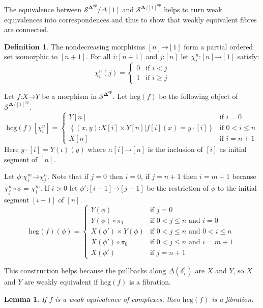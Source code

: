 \documentclass{amsart}
\theoremstyle{plain}
\newtheorem{lemma}[theorem]{Lemma}
\theoremstyle{definition}
\newtheorem{defin}[theorem]{Definition}
\newcommand\cat\mathcal
\newcommand\set[1]{\left\{#1\right\}}
\newcommand\dual{^{\mathrm{op}}}
\newcommand\simCat{\mathbf\Delta}
\newcommand\s{^{\simCat\dual}}
\newcommand\of{\mathord:}
\renewcommand\to{\mathord\rightarrow}
\newcommand\simplex\Delta
\begin{document}
The equivalence between $\cat S\s/\simplex[1]$ and $\cat S^{\simCat/[1]\dual}$ helps to turn weak equivalences into correspondences and thus to show that weakly equivalent fibres are connected.

\newcommand\hcg{\mathrm{hcg}}
\begin{defin} The nondecreasing morphisms $[n]\to[1]$ form a partial ordered set isomorphic to $[n+1]$. For all $i\of[n+1]$ and $j\of[n]$ let $\chi^n_i\of[n]\to[1]$ satisfy:
\[ \chi^n_i(j) =\left\{
	\begin{array}{cc}
		0 & \textrm{if $i<j$}\\
		1 & \textrm{if $i\geq j$}
	\end{array}
\right.\]

Let $f\of X\to Y$ be a morphism in $\cat S\s$. Let $\hcg(f)$ be the following object of $\cat S^{\simCat/[1]\dual}$. 
\[ \hcg(f)[\chi^n_i] =\left\{
	\begin{array}{cc}
		Y[n] & \textrm{if $i=0$}\\
		\set{ (x,y)\of X[i]\times Y[n] | f[i](x) = y\cdot[i] } & \textrm{if $0<i\leq n$}\\
		X[n] & \textrm{if $i=n+1$}
	\end{array}
\right.\]
Here $y\cdot[i] = Y(\iota)(y)$ where $\iota\of[i]\to[n]$ is the inclusion of $[i]$ as initial segment of $[n]$.

Let $\phi\of \chi^m_i\to\chi^n_j$. Note that if $j=0$ then $i=0$, if $j=n+1$ then $i=m+1$ because $\chi^n_j\circ \phi= \chi^m_i$. If $i>0$ let $\phi'\of [i-1]\to [j-1]$ be the restriction of $\phi$ to the initial segment $[i-1]$ of $[n]$.
\[ \hcg(f)(\phi) =\left\{
	\begin{array}{cc}
		Y(\phi) & \textrm{if $j=0$}\\
		Y(\phi)\circ \pi_1 & \textrm{if $0<j\leq n$ and $i=0$}\\
		X(\phi')\times Y(\phi) & \textrm{if $0<j\leq n$ and $0<i\leq n$}\\
		X(\phi')\circ \pi_0 & \textrm{if $0<j\leq n$ and $i=m+1$}\\
		X(\phi') & \textrm{if $j=n+1$}
	\end{array}
\right.\]
\end{defin}

This construction helps because the pullbacks along $\simplex(\delta^1_i)$ are $X$ and $Y$, so $X$ and $Y$ are weakly equivalent if $\hcg(f)$ is a fibration.

\begin{lemma} If $f$ is a weak equivalence of complexes, then $\hcg(f)$ is a fibration. \end{lemma}
\end{document}
